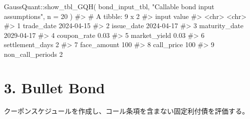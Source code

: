 \documentclass[
  letterpaper,
  DIV=11,
  numbers=noendperiod]{scrreprt}
\newenvironment{Shaded}{\begin{snugshade}}{\end{snugshade}}
\newcommand{\AttributeTok}[1]{\textcolor[rgb]{0.40,0.45,0.13}{#1}}
\newcommand{\CommentTok}[1]{\textcolor[rgb]{0.37,0.37,0.37}{#1}}
\newcommand{\DecValTok}[1]{\textcolor[rgb]{0.68,0.00,0.00}{#1}}
\newcommand{\FunctionTok}[1]{\textcolor[rgb]{0.28,0.35,0.67}{#1}}
\newcommand{\NormalTok}[1]{\textcolor[rgb]{0.00,0.23,0.31}{#1}}
\newcommand{\SpecialCharTok}[1]{\textcolor[rgb]{0.37,0.37,0.37}{#1}}
\newcommand{\StringTok}[1]{\textcolor[rgb]{0.13,0.47,0.30}{#1}}
\begin{document}
\begin{Shaded}
\begin{Highlighting}[]
\NormalTok{GaussQuant}\SpecialCharTok{::}\FunctionTok{show\_tbl\_GQH}\NormalTok{(}
\NormalTok{  bond\_input\_tbl,}
  \StringTok{"Callable bond input assumptions"}\NormalTok{,}
  \AttributeTok{n =} \DecValTok{20}
\NormalTok{)}
\CommentTok{\#\textgreater{} \# A tibble: 9 x 2}
\CommentTok{\#\textgreater{}   input            value     }
\CommentTok{\#\textgreater{}   \textless{}chr\textgreater{}            \textless{}chr\textgreater{}     }
\CommentTok{\#\textgreater{} 1 trade\_date       2024{-}04{-}15}
\CommentTok{\#\textgreater{} 2 issue\_date       2024{-}04{-}17}
\CommentTok{\#\textgreater{} 3 maturity\_date    2029{-}04{-}17}
\CommentTok{\#\textgreater{} 4 coupon\_rate      0.03      }
\CommentTok{\#\textgreater{} 5 market\_yield     0.03      }
\CommentTok{\#\textgreater{} 6 settlement\_days  2         }
\CommentTok{\#\textgreater{} 7 face\_amount      100       }
\CommentTok{\#\textgreater{} 8 call\_price       100       }
\CommentTok{\#\textgreater{} 9 non\_call\_periods 2}
\end{Highlighting}
\end{Shaded}

\section{3. Bullet Bond}\label{bullet-bond}

クーポンスケジュールを作成し、コール条項を含まない固定利付債を評価する。
\end{document}
